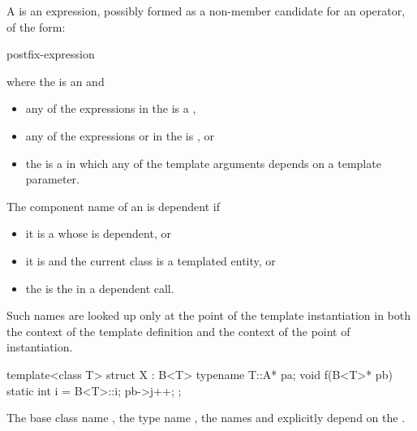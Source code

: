 \pnum
A  is an expression,
possibly formed as a non-member candidate for an operator,
of the form:
\begin{ncsimplebnf}
postfix-expression \terminal{(}  \terminal{)}
\end{ncsimplebnf}
where the 
is an  and
\begin{itemize}
\item
any of the expressions in the  is a
,
\item
any of the expressions
or 
in the
is , or
\item
the 
is a  in which any of the template arguments depends
on a template parameter.
\end{itemize}
The component name of an 
is dependent if
\begin{itemize}
\item
it is a 
whose  is dependent, or
\item
it is  and
the current class is a templated entity, or
\item
the  is
the  in a dependent call.
\end{itemize}
\begin{note}
Such names
are looked up only at the point of the template instantiation
in both the context of the template definition and the
context of the point of instantiation.
\end{note}

\pnum
\begin{example}
\begin{codeblock}
template<class T> struct X : B<T> {
  typename T::A* pa;
  void f(B<T>* pb) {
    static int i = B<T>::i;
    pb->j++;
  }
};
\end{codeblock}

The base class name
,
the type name
,
the names
and
explicitly depend on the
.
\end{example}

